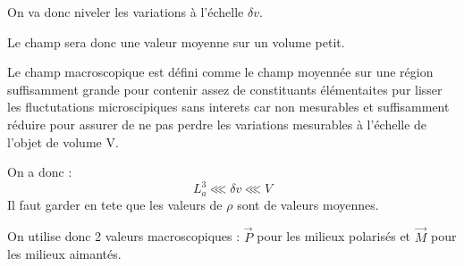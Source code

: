 \documentclass[french]{yLectureNote}
\renewcommand{\vec}{\overrightarrow}
\begin{document}
On va donc niveler les variations à l'échelle $\delta v$.

Le champ sera donc une valeur moyenne sur un volume petit.

Le champ macroscopique est défini comme le champ moyennée sur une région suffisamment grande pour contenir assez de constituants élémentaites pur lisser les fluctutations microscipiques sans interets car non mesurables et suffisamment réduire pour assurer de ne pas perdre les variations mesurables à l'échelle de l'objet de volume V.

On a donc :
$$L_a^3\lll \delta v\lll  V$$ Il faut garder en tete que les valeurs de $\rho$ sont de valeurs moyennes.

On utilise donc 2 valeurs macroscopiques : $\vec{P}$ pour les milieux polarisés et $\vec{M}$ pour les milieux aimantés.
\end{document}
